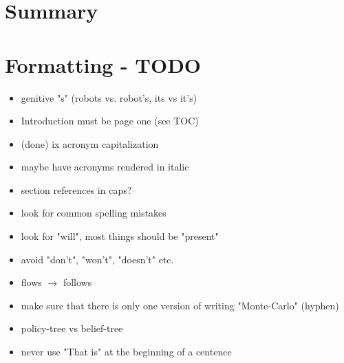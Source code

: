 \chapter{Summary}



\chapter{Formatting - TODO}

\begin{itemize}
  \item genitive "s" (robots vs. robot's, its vs it's) 
  \item Introduction must be page one (see TOC)
  \item (done) ix acronym capitalization
  \item maybe have acronyms rendered in italic
  \item section references in caps?
  \item look for common spelling mistakes
  \item look for "will", most things should be "present"
  \item avoid "don't", "won't", "doesn't" etc.\
  \item flows $\to$ follows
  \item make sure that there is only one version of writing "Monte-Carlo" (hyphen)
  \item policy-tree vs belief-tree
  \item never use "That is" at the beginning of a centence
\end{itemize}
